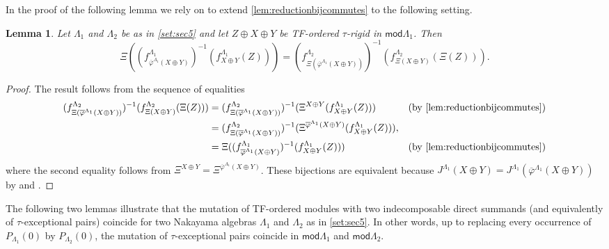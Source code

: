 \documentclass[11pt]{amsart}
\newcommand{\mods}{\mathsf{mod}}
\newtheorem{lemma}[theorem]{Lemma}
\theoremstyle{definition}
\begin{document}
In the proof of the following lemma we rely on \cite[Thm. 4.3]{BuanMarsh2018} to extend \cref{lem:reductionbijcommutes} to the following setting.
\begin{lemma}\label{lem:reductionstep}
    Let $\Lambda_1$ and $\Lambda_2$ be as in \cref{set:sec5} and let $Z \oplus X \oplus Y$ be TF-ordered $\tau$-rigid in $\mods \Lambda_1$. Then
    \[ \Xi( (f_{\overline{\varphi}^{\Lambda_1}(X \oplus Y)}^{\Lambda_1})^{-1} ( f_{X \oplus Y}^{\Lambda_1}(Z))) = (f_{\Xi(\overline{\varphi}^{\Lambda_1}(X \oplus Y))}^{\Lambda_2})^{-1} ( f_{\Xi(X \oplus Y)}^{\Lambda_2}(\Xi(Z))).\]
\end{lemma}
\begin{proof}
    The result follows from the sequence of equalities
    \begin{align*}
        (f_{\Xi(\overline{\varphi}^{\Lambda_1}(X \oplus Y))}^{\Lambda_2})^{-1} ( f_{\Xi(X \oplus Y)}^{\Lambda_2}(\Xi(Z))) &= (f_{\Xi(\overline{\varphi}^{\Lambda_1}(X \oplus Y))}^{\Lambda_2})^{-1} ( \Xi^{X \oplus Y}(f_{X \oplus Y}^{\Lambda_1}(Z))) &\text{(by \cref{lem:reductionbijcommutes})} \\
        &= (f_{\Xi(\overline{\varphi}^{\Lambda_1}(X \oplus Y))}^{\Lambda_2})^{-1} ( \Xi^{\overline{\varphi}^{\Lambda_1}(X \oplus Y)}(f_{X \oplus Y}^{\Lambda_1}(Z))), \\
        &= \Xi((f_{\overline{\varphi}^{\Lambda_1}(X \oplus Y)}^{\Lambda_1})^{-1} ( f_{X \oplus Y}^{\Lambda_1}(Z))) &\text{(by \cref{lem:reductionbijcommutes})}
    \end{align*}
    where the second equality follows from $\Xi^{X \oplus Y} = \Xi^{\overline{\varphi}^{\Lambda_1}(X \oplus Y)}$. These bijections are equivalent because $J^{\Lambda_1}(X \oplus Y) = J^{\Lambda_1}(\overline{\varphi}^{\Lambda_1}(X \oplus Y))$ by \cite[Def.-Prop. 4.3 and 4.4]{BHM2024} and \cite[Thm. 6.4]{buan2023perpendicular}.
\end{proof}



The following two lemmas illustrate that the mutation of TF-ordered modules with two indecomposable direct summands (and equivalently of $\tau$-exceptional pairs) coincide for two Nakayama algebras $\Lambda_1$ and $\Lambda_2$ as in \cref{set:sec5}. In other words, up to replacing every occurrence of $P_{\Lambda_1}(0)$ by $P_{\Lambda_2}(0)$, the mutation of $\tau$-exceptional pairs coincide in $\mods \Lambda_1$ and $\mods \Lambda_2$. 
\end{document}
